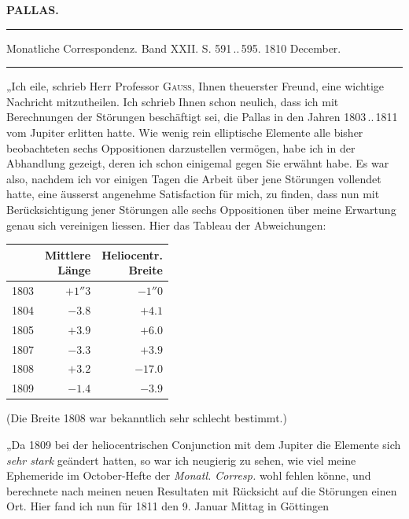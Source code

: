 \clearpage{}\hypertarget{native-325-lower}{}\label{native-325-lower}
\begin{center}\textbf{PALLAS.}\par\vspace{4pt}\hrule\vspace{4pt}\fontsize{10}{12}\selectfont Monatliche Correspondenz. Band XXII. S. 591\,..\,595. 1810 December.\par\vspace{4pt}\hrule\vspace{4pt}\end{center}

\par\indent „Ich eile, schrieb Herr Professor \textsc{Gauss}, Ihnen theuerster Freund, eine wichtige Nachricht mitzutheilen. Ich schrieb Ihnen schon neulich, dass ich mit Berechnungen der Störungen beschäftigt sei, die Pallas in den Jahren 1803\,..\,1811 vom Jupiter erlitten hatte. Wie wenig rein elliptische Elemente alle bisher beobachteten sechs Oppositionen darzustellen vermögen, habe ich in der Abhandlung gezeigt, deren ich schon einigemal gegen Sie erwähnt habe. Es war also, nachdem ich vor einigen Tagen die Arbeit über jene Störungen vollendet hatte, eine äusserst angenehme Satisfaction für mich, zu finden, dass nun mit Berücksichtigung jener Störungen alle sechs Oppositionen über meine Erwartung genau sich vereinigen liessen. Hier das Tableau der Abweichungen:

\begin{center}\fontsize{10}{12}\selectfont\setlength{\tabcolsep}{4pt}\renewcommand{\arraystretch}{1.15}\begin{tabular}{r|r|r}
 & \shortstack{Mittlere\\Länge} & \shortstack{Heliocentr.\\Breite}\\\hline
1803 & $+1''3$ & $-1''0$\\
1804 & $-3.8$ & $+4.1$\\
1805 & $+3.9$ & $+6.0$\\
1807 & $-3.3$ & $+3.9$\\
1808 & $+3.2$ & $-17.0$\\
1809 & $-1.4$ & $-3.9$\\
\end{tabular}\end{center}
\noindent (Die Breite 1808 war bekanntlich sehr schlecht bestimmt.)

\par\indent „Da 1809 bei der heliocentrischen Conjunction mit dem Jupiter die Elemente sich \emph{sehr stark} geändert hatten, so war ich neugierig zu sehen, wie viel meine Ephemeride im October-Hefte der \emph{Monatl. Corresp.} wohl fehlen könne, und berechnete nach meinen neuen Resultaten mit Rücksicht auf die Störungen einen Ort. Hier fand ich nun für 1811 den 9. Januar Mittag in Göttingen

